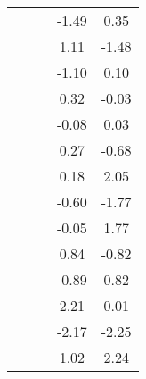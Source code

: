 \begin{table}
\begin{tabular}{c|cc|cc|}
\multicolumn{1}{|c|}{} & \multicolumn{1}{|c|}{} & \multicolumn{1}{|c|}{} & \multicolumn{1}{|c|}{     -1.49} & \multicolumn{1}{|c|}{      0.35} \\ 
\multicolumn{1}{|c|}{} & \multicolumn{1}{|c|}{} & \multicolumn{1}{|c|}{} & \multicolumn{1}{|c|}{      1.11} & \multicolumn{1}{|c|}{     -1.48} \\ 
\multicolumn{1}{|c|}{} & \multicolumn{1}{|c|}{} & \multicolumn{1}{|c|}{} & \multicolumn{1}{|c|}{     -1.10} & \multicolumn{1}{|c|}{      0.10} \\ 
\multicolumn{1}{|c|}{} & \multicolumn{1}{|c|}{} & \multicolumn{1}{|c|}{} & \multicolumn{1}{|c|}{      0.32} & \multicolumn{1}{|c|}{     -0.03} \\ 
\multicolumn{1}{|c|}{} & \multicolumn{1}{|c|}{} & \multicolumn{1}{|c|}{} & \multicolumn{1}{|c|}{     -0.08} & \multicolumn{1}{|c|}{      0.03} \\ 
\multicolumn{1}{|c|}{} & \multicolumn{1}{|c|}{} & \multicolumn{1}{|c|}{} & \multicolumn{1}{|c|}{      0.27} & \multicolumn{1}{|c|}{     -0.68} \\ 
\multicolumn{1}{|c|}{} & \multicolumn{1}{|c|}{} & \multicolumn{1}{|c|}{} & \multicolumn{1}{|c|}{      0.18} & \multicolumn{1}{|c|}{      2.05} \\ 
\multicolumn{1}{|c|}{} & \multicolumn{1}{|c|}{} & \multicolumn{1}{|c|}{} & \multicolumn{1}{|c|}{     -0.60} & \multicolumn{1}{|c|}{     -1.77} \\ 
\multicolumn{1}{|c|}{} & \multicolumn{1}{|c|}{} & \multicolumn{1}{|c|}{} & \multicolumn{1}{|c|}{     -0.05} & \multicolumn{1}{|c|}{      1.77} \\ 
\multicolumn{1}{|c|}{} & \multicolumn{1}{|c|}{} & \multicolumn{1}{|c|}{} & \multicolumn{1}{|c|}{      0.84} & \multicolumn{1}{|c|}{     -0.82} \\ 
\multicolumn{1}{|c|}{} & \multicolumn{1}{|c|}{} & \multicolumn{1}{|c|}{} & \multicolumn{1}{|c|}{     -0.89} & \multicolumn{1}{|c|}{      0.82} \\ 
\multicolumn{1}{|c|}{} & \multicolumn{1}{|c|}{} & \multicolumn{1}{|c|}{} & \multicolumn{1}{|c|}{      2.21} & \multicolumn{1}{|c|}{      0.01} \\ 
\multicolumn{1}{|c|}{} & \multicolumn{1}{|c|}{} & \multicolumn{1}{|c|}{} & \multicolumn{1}{|c|}{     -2.17} & \multicolumn{1}{|c|}{     -2.25} \\ 
\multicolumn{1}{|c|}{} & \multicolumn{1}{|c|}{} & \multicolumn{1}{|c|}{} & \multicolumn{1}{|c|}{      1.02} & \multicolumn{1}{|c|}{      2.24} \\ 

\end{tabular}
\end{table}
